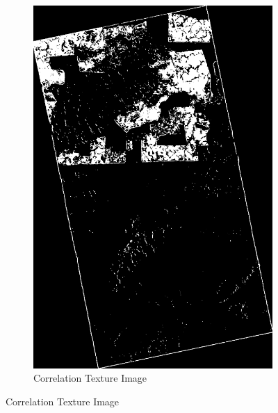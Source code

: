 \begin{figure}[H]
\begin{subfigure}[b]{0.4\linewidth}
    \includegraphics[width=\linewidth]{Chapter4/sum_and_diff_textures/correlationimage.png}
     \caption{Correlation Texture Image}
  \end{subfigure}
\end{figure}
\newpage
